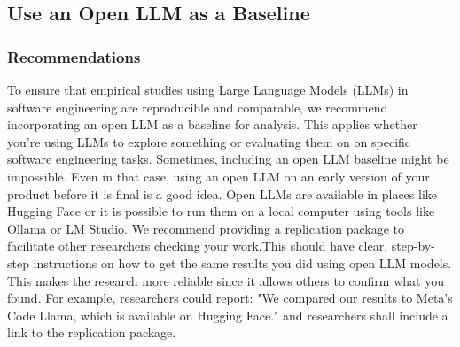 



\subsection{Use an Open LLM as a Baseline}

\subsubsection{Recommendations}

To ensure that empirical studies using Large Language Models (LLMs) in software engineering are reproducible and comparable, 
we recommend incorporating an open LLM as a baseline for analysis. This applies whether you're using LLMs to explore something or evaluating them
on on specific software engineering tasks. 
Sometimes, including an open LLM baseline might be impossible. 
Even in that case, using an open LLM on an early version of your product before it is final is a good idea.
Open LLMs are available in places like Hugging Face or it is possible to run them on a local computer using tools like Ollama or LM Studio. 
We recommend providing a replication package to facilitate other researchers checking your work.This should have clear, step-by-step instructions on how to get the same results you did using open LLM models. This makes the research more reliable since it allows others to confirm what you found.
For example, researchers could report: "We compared our results to Meta's Code Llama, which is available on Hugging Face." and researchers shall include a link to the replication package.

